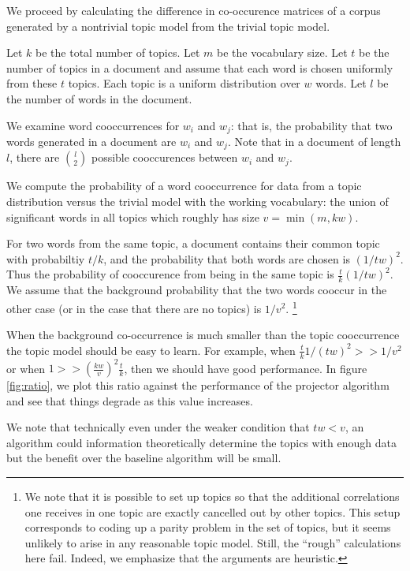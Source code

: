 We proceed by calculating the difference in co-occurence matrices of a
corpus generated by a nontrivial topic model from the trivial topic
model.

Let $k$ be the total number of topics. Let $m$ be the vocabulary size. Let
$t$ be the number of topics in a document and assume that 
each word is chosen uniformly from these $t$ topics. Each topic is a
uniform distribution over $w$ words. 
Let $l$ be the number of words in the document.

We examine word cooccurrences for $w_i$ and $w_j$: that is, the
probability that two words generated in a document are $w_i$ and
$w_j$.  Note that in a document of length $l$, there are ${l \choose
2}$ possible cooccurences between $w_i$ and $w_j$.

We compute the probability of a word cooccurrence for data from a
topic distribution versus  the trivial model with the working
vocabulary: the union of significant words in all topics which roughly has
size $v = \min(m,kw)$.

For two words from the same topic, a document contains their common
topic with probabiltiy $t/k$, and the probability that both words are
chosen is $(1/tw)^2$. Thus the probability of cooccurence from being
in the same topic is $\frac{t}{k} (1/tw)^2$.  We assume that the background
probability that the two words cooccur in the other case (or in the
case that there are no topics) is $1/v^2$.  \footnote{We note that it
is possible to set up topics so that the additional correlations one
receives in one topic are exactly cancelled out by other topics.  This
setup corresponds to coding up a parity problem in the set of topics,
but it seems unlikely to arise in any reasonable topic model.  Still,
the ``rough'' calculations here fail. Indeed, we emphasize that the
arguments are heuristic.}

When the background co-occurrence is much smaller than the
topic cooccurrence the topic model should be easy to learn.  For
example, when $\frac{t}{k}{1/(tw)^2} >> 1/v^2$ or when $1 >>
(\frac{kw}{v})^2 \frac{t}{k}$, then we should have good
performance. In figure \ref{fig:ratio}, we plot this ratio against the
performance of the projector algorithm and see that things degrade as
this value increases.


We note that technically even under the weaker condition that $tw <
v$, an algorithm could information theoretically determine the topics
with enough data but the benefit over the baseline algorithm will be
small. 

